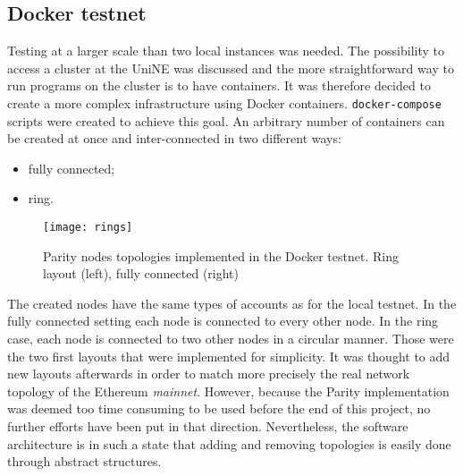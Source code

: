 \subsection{Docker testnet}
Testing at a larger scale than two local instances was needed. The possibility
to access a cluster at the UniNE was discussed and the more straightforward way
to run programs on the cluster is to have containers. It was therefore decided
to create a more complex infrastructure using Docker containers.
\texttt{docker-compose} scripts were created to achieve this goal. An arbitrary
number of containers can be created at once and inter-connected in two different
ways:
\begin{itemize}
    \item fully connected;
    \item ring.
\end{itemize}

\begin{figure}
	\centering
	\texttt{[image: rings]}
    \caption{Parity nodes topologies implemented in the Docker testnet. Ring
    layout (left), fully connected (right)}
	\label{fig:layout}
\end{figure}

The created nodes have the same types of accounts as for the local testnet.
In the fully connected setting each node is connected to every other node. In
the ring case, each node is connected to two other nodes in a circular manner.
Those were the two first layouts that were implemented for simplicity. It was
thought to add new layouts afterwards in order to match more precisely the real
network topology of the Ethereum \textit{mainnet}. However, because the Parity
implementation was deemed too time consuming to be used before the end of this
project, no further efforts have been put in that direction. Nevertheless, the
software architecture is in such a state that adding and removing topologies is
easily done through abstract structures.

